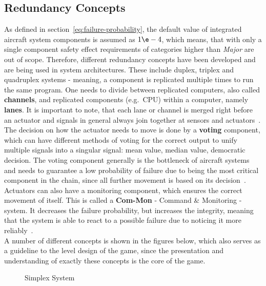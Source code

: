 \subsection{Redundancy Concepts}\label{subsec:redundancy-concepts}
As defined in section~\ref{eq:failure-probability}, the default value of integrated aircraft system components is assumed as
$1\e-4$, which means, that with only a single component safety effect requirements of categories higher than \textit{Major} are out of scope.
Therefore, different redundancy concepts have been developed and are being used in system architectures.
These include duplex, triplex and quadruplex systems - meaning, a component is replicated multiple times to run the same program.
One needs to divide between replicated computers, also called \textbf{channels}, and replicated components (e.g.\ CPU) within a computer,
namely \textbf{lanes}.
It is important to note, that each lane or channel is merged right before an actuator and signals in general always join together
at sensors and actuators~\cite{lfs1}.
\\
The decision on how the actuator needs to move is done by a \textbf{voting} component, which can have different methods of voting
for the correct output to unify multiple signals into a singular signal: mean value, median value, democratic decision.
The voting component generally is the bottleneck of aircraft systems and needs to guarantee a low probability of failure
due to being the most critical component in the chain, since all further movement is based on its decision~\cite{lfs1}.
\\
Actuators can also have a monitoring component, which ensures the correct movement of itself.
This is called a \textbf{Com-Mon} - Command \& Monitoring - system.
It decreases the failure probability, but increases the integrity, meaning that the system is able to react to a possible failure due
to noticing it more reliably~\cite{lfs1}.
\\
A number of different concepts is shown in the figures below, which also serves as a guideline to the level design of the game,
since the presentation and understanding of exactly these concepts is the core of the game.
\\
\begin{figure}
    \begin{center}
    \end{center}
    \caption{Simplex System}
    \label{fig:simplex-example}
\end{figure}
